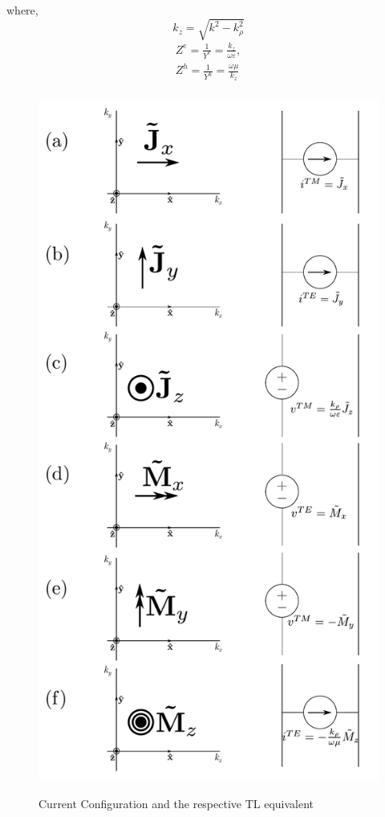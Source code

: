 \documentclass[11pt]{article}
\renewcommand{\O}{\omega}  %
\newcommand{\E}{\varepsilon}  %
\renewcommand{\u}{\mu}  %
\newcommand{\p}{\rho}  %
\renewcommand{\^}{\hat}  %
\begin{document}
  where,
  \begin{equation}
    k_z = \sqrt{k^2 - k_{\p}^2}
    \label{eq:k_z}
  \end{equation}
  \begin{equation}
    \begin{split}
      Z^e = \frac{1}{Y^e} = \frac{k_z}{\O \E},\\
      Z^h = \frac{1}{Y^h} = \frac{\O \u}{k_z}\\
    \end{split}
    \label{eq:Z}
  \end{equation}
%
  \begin{figure}[h!]
    \centering
    {\includegraphics[scale=.6]{source_configuration.pdf}}
    \caption{Current Configuration and the respective TL equivalent}
    \label{fig:Sources}
  \end{figure}
\end{document}

